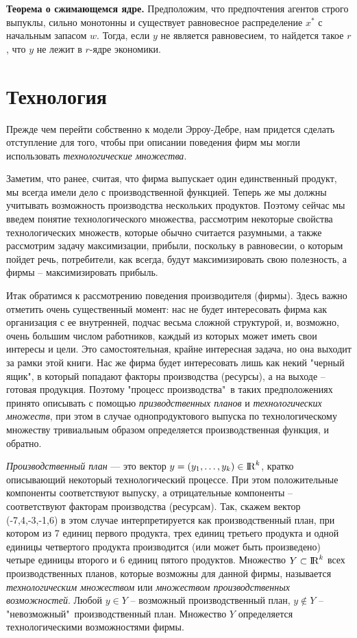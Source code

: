\textbf{Теорема о сжимающемся ядре.} Предположим, что предпочтения агентов строго выпуклы,
сильно монотонны и существует равновесное распределение $x^*$ с начальным запасом $w$.
Тогда, если $y$ не является равновесием, то найдется такое $r$, что $y$ не лежит в
$r$-ядре экономики.


\section{Технология}

Прежде чем перейти собственно к модели Эрроу-Дебре, нам придется
сделать отступление для того, чтобы при описании поведения фирм
мы могли использовать \emph{технологические множества}.

Заметим, что ранее, считая, что фирма выпускает один единственный
продукт, мы всегда имели дело с производственной функцией. Теперь
же мы должны учитывать возможность производства нескольких
продуктов. Поэтому сейчас мы введем понятие технологического
множества, рассмотрим некоторые свойства технологических множеств,
которые обычно считается разумными, а также рассмотрим задачу максимизации,
прибыли, поскольку в равновесии, о которым пойдет речь, потребители,
как всегда, будут максимизировать свою полезность, а фирмы -- максимизировать
прибыль.

Итак обратимся к рассмотрению поведения производителя (фирмы).
Здесь важно отметить очень существенный момент: нас не будет
интересовать фирма как организация с ее внутренней, подчас весьма
сложной структурой, и, возможно, очень большим числом работников,
каждый из которых может иметь свои интересы и цели. Это
самостоятельная, крайне интересная задача, но она выходит
за рамки этой книги. Нас же фирма будет
интересовать лишь как некий "черный ящик", в который попадают
факторы производства (ресурсы), а на выходе -- готовая продукция.
Поэтому "процесс производства"\, в таких предположениях принято
описывать с помощью \emph{призводственных планов} и \emph{технологических
множеств}, при этом в случае однопродуктового выпуска по
технологическому множеству тривиальным образом определяется
производственная функция, и обратно.


\emph{Производственный план}
--- это вектор $y=(y_1,\ldots,y_k)\in{\rm I\!R}^k$, кратко описывающий некоторый
технологический процессе. При этом положительные компоненты
соответствуют выпуску, а отрицательные компоненты -- соответствуют
факторам производства (ресурсам). Так, скажем вектор (-7,4,-3,-1,6) в этом случае
интерпретируется как производственный план, при котором из 7 единиц
первого продукта, трех единиц третьего продукта и одной единицы четвертого
продукта производится (или может быть произведено) четыре единицы второго
и 6 единиц пятого продуктов.
Множество $Y\subset{\rm I\!R}^k$ всех производственных планов, которые возможны для
данной фирмы, называется \emph{технологическим множеством} или
\emph{множеством производственных возможностей}.
Любой $y\in Y$ -- возможный производственный план,
$y\notin Y$ -- "невозможный"\, производственный план. Множество $Y$
определяется технологическими возможностями фирмы.

